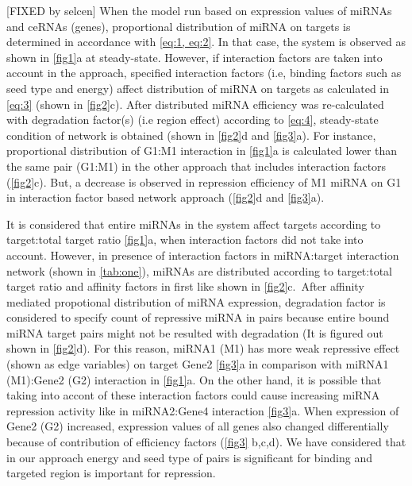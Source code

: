 \documentclass[]{article}
\begin{document}
{[}FIXED by selcen{]} When the model run based on expression values of
miRNAs and ceRNAs (genes), proportional distribution of miRNA on targets
is determined in accordance with \eqref{eq:1, eq:2}. In that case, the
system is observed as shown in \autoref{fig1}a at steady-state. However,
if interaction factors are taken into account in the approach, specified
interaction factors (i.e, binding factors such as seed type and energy)
affect distribution of miRNA on targets as calculated in \eqref{eq:3}
(shown in \autoref{fig2}c). After distributed miRNA efficiency was
re-calculated with degradation factor(s) (i.e region effect) according
to \eqref{eq:4}, steady-state condition of network is obtained (shown in
\autoref{fig2}d and \autoref{fig3}a). For instance, proportional
distribution of G1:M1 interaction in \autoref{fig1}a is calculated lower
than the same pair (G1:M1) in the other approach that includes
interaction factors (\autoref{fig2}c). But, a decrease is observed in
repression efficiency of M1 miRNA on G1 in interaction factor based
network approach (\autoref{fig2}d and \autoref{fig3}a).

It is considered that entire miRNAs in the system affect targets
according to target:total target ratio \autoref{fig1}a, when interaction
factors did not take into account. However, in presence of interaction
factors in miRNA:target interaction network (shown in
\autoref{tab:one}), miRNAs are distributed according to target:total
target ratio and affinity factors in first like shown in
\autoref{fig2}c.~After affinity mediated propotional distribution of
miRNA expression, degradation factor is considered to specify count of
repressive miRNA in pairs because entire bound miRNA target pairs might
not be resulted with degradation (It is figured out shown in
\autoref{fig2}d). For this reason, miRNA1 (M1) has more weak repressive
effect (shown as edge variables) on target Gene2 \autoref{fig3}a in
comparison with miRNA1 (M1):Gene2 (G2) interaction in \autoref{fig1}a.
On the other hand, it is possible that taking into accont of these
interaction factors could cause increasing miRNA repression activity
like in miRNA2:Gene4 interaction \autoref{fig3}a. When expression of
Gene2 (G2) increased, expression values of all genes also changed
differentially because of contribution of efficiency factors
(\autoref{fig3} b,c,d). We have considered that in our approach energy
and seed type of pairs is significant for binding and targeted region is
important for repression.
\end{document}
